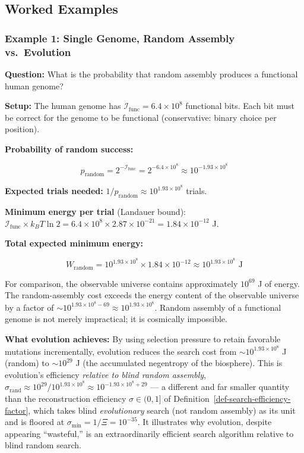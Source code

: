 \documentclass[11pt]{article}
\theoremstyle{plain}
\theoremstyle{definition}
\theoremstyle{remark}
\let\origsubsection\subsection
\renewcommand{\subsection}{\needspace{7\baselineskip}\origsubsection}
\let\origsubsubsection\subsubsection
\renewcommand{\subsubsection}{\needspace{4\baselineskip}\origsubsubsection}
\begin{document}
\subsection{Worked Examples}\label{worked-examples-1}

\subsubsection{Example 1: Single Genome, Random Assembly
vs.~Evolution}\label{example-1-single-genome-random-assembly-vs.-evolution}

\textbf{Question:} What is the probability that random assembly produces
a functional human genome?

\textbf{Setup:} The human genome has
\(\mathcal{I}_{\text{func}} = 6.4 \times 10^8\) functional bits. Each
bit must be correct for the genome to be functional (conservative:
binary choice per position).

\textbf{Probability of random success:}

\[p_{\text{random}} = 2^{-\mathcal{I}_{\text{func}}} = 2^{-6.4 \times 10^8} \approx 10^{-1.93 \times 10^8}\]

\textbf{Expected trials needed:}
\(1/p_{\text{random}} \approx 10^{1.93 \times 10^8}\) trials.

\textbf{Minimum energy per trial} (Landauer bound):
\(\mathcal{I}_{\text{func}} \times k_B T \ln 2 = 6.4 \times 10^8 \times 2.87 \times 10^{-21} = 1.84 \times 10^{-12}\)
J.

\textbf{Total expected minimum energy:}

\[W_{\text{random}} = 10^{1.93 \times 10^8} \times 1.84 \times 10^{-12} \approx 10^{1.93 \times 10^8} \text{ J}\]

For comparison, the observable universe contains approximately
\(10^{69}\) J of energy\citep{Penrose2005}. The random-assembly cost
exceeds the energy content of the observable universe by a factor of
\(\sim 10^{1.93 \times 10^8 - 69} \approx 10^{1.93 \times 10^8}\).
Random assembly of a functional genome is not merely impractical; it is
cosmically impossible.

\textbf{What evolution achieves:} By using selection pressure to retain
favorable mutations incrementally, evolution reduces the search cost
from \(\sim 10^{1.93 \times 10^8}\) J (random) to \(\sim 10^{29}\) J
(the accumulated negentropy of the biosphere). This is evolution's
efficiency \emph{relative to blind random assembly},
\(\sigma_{\text{rand}} \approx 10^{29} / 10^{1.93 \times 10^8} \approx 10^{-1.93 \times 10^8 + 29}\)
--- a different and far smaller quantity than the reconstruction
efficiency \(\sigma \in (0,1]\) of
Definition~\ref{def-search-efficiency-factor}, which takes blind
\emph{evolutionary} search (not random assembly) as its unit and is
floored at \(\sigma_{\min} = 1/\Xi = 10^{-35}\). It illustrates why
evolution, despite appearing ``wasteful,'' is an extraordinarily
efficient search algorithm relative to blind random search.
\end{document}
